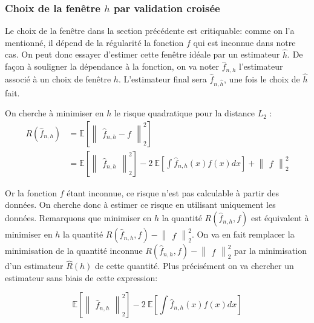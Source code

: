 \documentclass[
]{book}
\begin{document}
\hypertarget{choix-de-la-fenuxeatre-h-par-validation-croisuxe9e}{%
\subsubsection{\texorpdfstring{Choix de la fenêtre \(h\) par validation croisée}{Choix de la fenêtre h par validation croisée}}\label{choix-de-la-fenuxeatre-h-par-validation-croisuxe9e}}

Le choix de la fenêtre dans la section précédente est critiquable: comme on l'a mentionné, il dépend de la régularité la fonction \(f\) qui est inconnue dans notre cas. On peut donc essayer d'estimer cette fenêtre idéale par un estimateur \(\hat{h}\). De façon à souligner la dépendance à la fonction, on va noter \(\hat{f}_{n,h}\) l'estimateur associé à un choix de fenêtre \(h\). L'estimateur final sera \(\hat{f}_{n,\hat{h}}\), une fois le choix de \(\hat{h}\) fait.\newline 

On cherche à minimiser en \(h\) le risque quadratique pour la distance \(L_2\) :
\[
\begin{aligned}
R(\hat {f}_{n,h})&=\mathbb{E}[\begin{Vmatrix}\hat {f}_{n,h}-f\end{Vmatrix}_2^2]\\        
&= \mathbb{E}[\begin{Vmatrix}\hat {f}_{n,h}\end{Vmatrix}_2^2] -2~\mathbb{E}[\int \hat {f}_{n,h}(x)f(x)dx] +\begin{Vmatrix}f\end{Vmatrix}_2^2
\end{aligned}
\]

Or la fonction \(f\) étant inconnue, ce risque n'est pas calculable à partir des données. On cherche donc à estimer ce risque en utilisant uniquement les données. Remarquons que minimiser en \(h\) la quantité \(R(\hat {f}_{n,h}, f)\) est équivalent à minimiser en \(h\) la quantité \(R(\hat {f}_{n,h}, f)-\begin{Vmatrix}f\end{Vmatrix}_2^2\). On va en fait remplacer la minimisation de la quantité inconnue \(R(\hat {f}_{n,h}, f)-\begin{Vmatrix}f\end{Vmatrix}_2^2\) par la minimisation d'un estimateur \(\hat {R}(h)\) de cette quantité. Plus précisément on va chercher un estimateur sans biais de cette expression:

\[
\mathbb{E}[\begin{Vmatrix}\hat {f}_{n,h}\end{Vmatrix}_2^2] -2~\mathbb{E}[\int \hat {f}_{n,h}(x)f(x)dx]
\]
\end{document}
